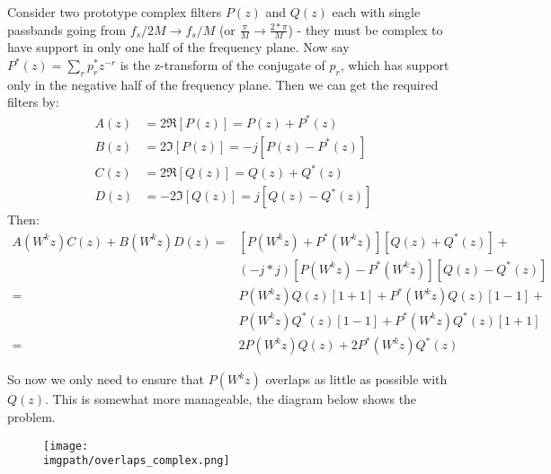 Consider two prototype complex filters $P(z)$ and $Q(z)$ each with single
passbands going from $f_s/2M \rightarrow f_s/M$ (or $\frac{\pi}{M} \rightarrow
\frac{2*\pi}{M}$) - they must be complex to have support in only one half of the
frequency plane. Now say $P^*(z) = \sum_{r}p_r^*z^{-r}$ is the z-transform of
the conjugate of $p_r$, which has support only in the negative half of the
frequency plane. Then we can get the required filters by:
\begin{align}
A(z) &= 2\Re [P(z)] = P(z) + P^*(z) \\
B(z) &= 2\Im [P(z)] = -j[P(z) - P^*(z)] \\
C(z) &= 2\Re [Q(z)] = Q(z) + Q^*(z) \\
D(z) &= -2\Im [Q(z)] = j[Q(z) - Q^*(z)]
\end{align}
Then:
\begin{align}
  A(W^kz)C(z) + B(W^kz)D(z) = &  \left[P(W^kz) + P^*(W^kz)\right]\left[Q(z) + Q^*(z)\right] + \nonumber \\
                            & (-j*j)\left[P(W^kz) - P^*(W^kz)\right]\left[Q(z) - Q^*(z)\right] \\
                          = & P(W^kz)Q(z)[1+1] + P^*(W^kz)Q(z)[1-1] + \nonumber \\ 
                            & P(W^kz)Q^*(z)[1-1] + P^*(W^kz)Q^*(z)[1+1] \\
                          = & 2P(W^kz)Q(z) + 2P^*(W^kz)Q^*(z)
\end{align}

So now we only need to ensure that $P(W^kz)$ overlaps as little as possible with
$Q(z)$. This is somewhat more manageable, the diagram below shows the problem.

\begin{figure}
  \texttt{[image: \\imgpath/overlaps\_complex.png]}
\end{figure}


